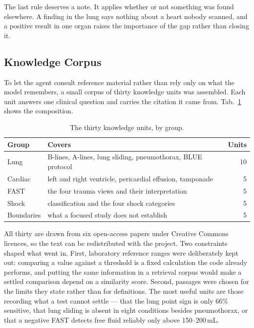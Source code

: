 The last rule deserves a note. It applies whether or not something was found elsewhere. A
finding in the lung says nothing about a heart nobody scanned, and a positive result in one
organ raises the importance of the gap rather than closing it.

\subsection{Knowledge Corpus}
\label{subsec:reasoning-kb}

To let the agent consult reference material rather than rely only on what the model
remembers, a small corpus of thirty knowledge units was assembled. Each unit answers one
clinical question and carries the citation it came from. Tab.~\ref{tab:corpus} shows the
composition.

\begin{table}[H]
  \centering
  \small
  \begin{tabular}{llr}
    \toprule
    \textbf{Group} & \textbf{Covers} & \textbf{Units} \\
    \midrule
    Lung       & B-lines, A-lines, lung sliding, pneumothorax, BLUE protocol & 10 \\
    Cardiac    & left and right ventricle, pericardial effusion, tamponade   & 5 \\
    FAST       & the four trauma views and their interpretation              & 5 \\
    Shock      & classification and the four shock categories                & 5 \\
    Boundaries & what a focused study does not establish                     & 5 \\
    \bottomrule
  \end{tabular}
  \caption{The thirty knowledge units, by group.}
  \label{tab:corpus}
\end{table}

All thirty are drawn from six open-access papers under Creative Commons licences, so the
text can be redistributed with the project. Two constraints shaped what went in. First,
laboratory reference ranges were deliberately kept out: comparing a value against a
threshold is a fixed calculation the code already performs, and putting the same
information in a retrieval corpus would make a settled comparison depend on a similarity
score. Second, passages were chosen for the limits they state rather than for definitions.
The most useful units are those recording what a test cannot settle --- that the lung point
sign is only 66\% sensitive, that lung sliding is absent in eight conditions besides
pneumothorax, or that a negative FAST detects free fluid reliably only above
150--200\,mL.

